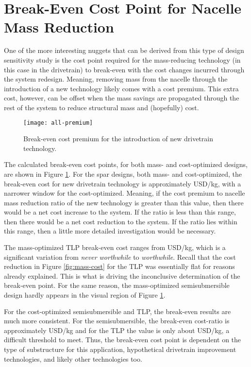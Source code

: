 \section{Break-Even Cost Point for Nacelle Mass Reduction}
One of the more interesting nuggets that can be derived from this type
of design sensitivity study is the cost point required for the
mass-reducing technology (in this case in the drivetrain) to break-even
with the cost changes incurred through the system redesign.  Meaning,
removing mass from the nacelle through the introduction of a new
technology likely comes with a cost premium.  This extra cost, however,
can be offset when the mass savings are propagated through the rest of
the system to reduce structural mass and (hopefully) cost.

\begin{figure}[htbp]
  \begin{center}
    \texttt{[image: all-premium]}
    \caption{Break-even cost premium for the introduction of new drivetrain
      technology.}
    \label{fig:premium}
  \end{center}
\end{figure}

The calculated break-even cost points, for both mass- and cost-optimized
designs, are shown in Figure \ref{fig:premium}.  For the spar designs,
both mass- and cost-optimized, the break-even cost for new drivetrain
technology is approximately \unit[700--1400]{USD/kg}, with a narrower
window for the cost-optimized.  Meaning, if the cost premium to nacelle
mass reduction ratio of the new technology is greater than this value,
then there would be a net cost increase to the system.  If the ratio is
less than this range, then there would be a net cost reduction to the
system.  If the ratio lies within this range, then a little more
detailed investigation would be necessary.

The mass-optimized TLP break-even cost ranges from
\unit[0--600]{USD/kg}, which is a significant variation from
\textit{never worthwhile} to \textit{worthwhile}.  Recall that the cost
reduction in Figure \ref{fig:mass-cost} for the TLP was essentially flat
for reasons already explained.  This is what is driving the inconclusive
determination of the break-even point.  For the same reason, the
mass-optimized semisubmersible design hardly appears in the visual
region of Figure \ref{fig:premium}.

For the cost-optimized semisubmersible and TLP, the break-even results
are much more consistent.  For the semisubmersible, the break-even
cost-ratio is approximately \unit[400--500]{USD/kg} and for the TLP the
value is only about \unit[100]{USD/kg}, a difficult threshold to meet.
Thus, the break-even cost point is dependent on the type of substructure
for this application, hypothetical drivetrain improvement technologies,
and likely other technologies too.

